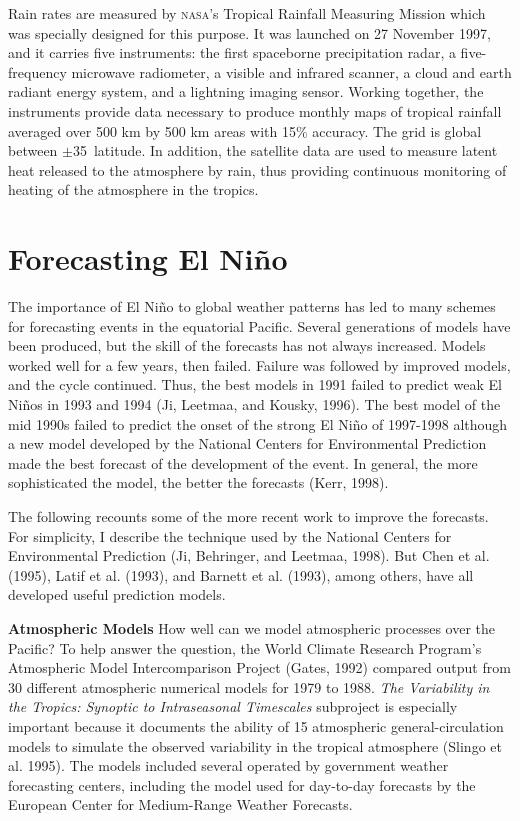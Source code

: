 Rain rates are measured by \textsc{nasa}'s
Tropical Rainfall Measuring Mission which was specially designed for
this purpose. It was launched on 27 November 1997, and it carries five
instruments: the first spaceborne precipitation radar, a
five-frequency microwave radiometer, a visible and infrared scanner, a
cloud and earth radiant energy system, and a lightning imaging
sensor. Working together, the instruments provide data necessary to
produce monthly maps of tropical rainfall
averaged over 500 km by 500 km areas with 15\%
accuracy. The grid is global between
$\pm$35\degrees\ latitude. In addition, the satellite data are used to
measure latent heat released to the atmosphere by rain, thus providing
continuous monitoring of heating of the atmosphere in the tropics.

\section{Forecasting El Ni\~{n}o}
The
importance of El Ni\~{n}o to global weather patterns has led to many
schemes for forecasting events in the equatorial Pacific. Several
generations of models have been produced, but the skill of the
forecasts has not always increased. Models worked well for a few
years, then failed. Failure was followed by improved models, and the
cycle continued. Thus, the best models in 1991 failed to predict weak
El Ni\~{n}os in 1993 and 1994 (Ji, Leetmaa, and Kousky, 1996). The
best model of the mid 1990s failed to predict the onset of the strong
El Ni\~{n}o of 1997-1998 although a new model developed by the
National Centers for Environmental Prediction made the best forecast
of the development of the event. In general, the more sophisticated
the model, the better the forecasts (Kerr, 1998).

The following recounts some of the more recent work to improve the
forecasts.  For simplicity, I describe the technique used by the
National Centers for Environmental Prediction (Ji, Behringer, and
Leetmaa, 1998). But Chen et al.  (1995), Latif et al. (1993), and
Barnett et al. (1993), among others, have all developed useful
prediction models.

\textbf{Atmospheric Models} How well can we model atmospheric
processes over the  Pacific? To help answer
the question, the World Climate Research Program's Atmospheric Model
Intercomparison Project (Gates, 1992) compared output from 30
different atmospheric numerical models for 1979 to 1988. \textit{The
  Variability in the Tropics: Synoptic to Intraseasonal Timescales}
subproject is especially important because it documents the ability of
15 atmospheric general-circulation models to simulate the observed
variability in the tropical atmosphere (Slingo et al. 1995). The
models included several operated by government weather forecasting
centers, including the model used for day-to-day forecasts by the
European Center for Medium-Range Weather Forecasts.

